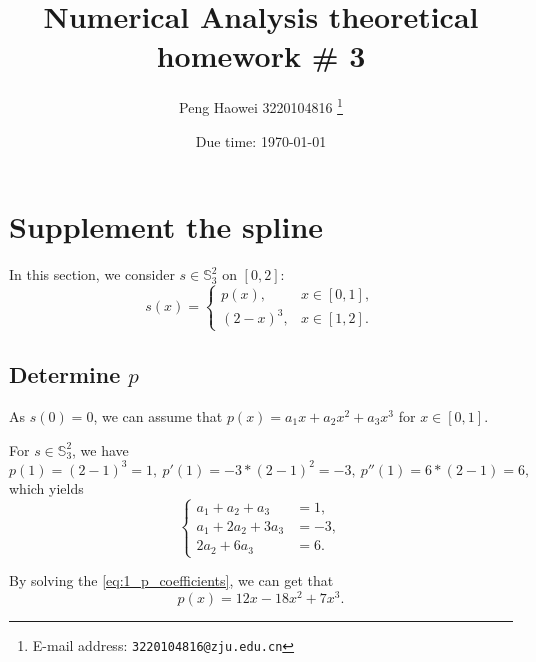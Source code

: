 \documentclass[a4paper]{article}
\begin{document}
\title{\textbf{Numerical Analysis theoretical homework \# 3}}

\author{Peng Haowei 3220104816
  \thanks{E-mail address: \texttt{3220104816@zju.edu.cn}}}

\date{Due time: \today}

\maketitle

\section{Supplement the spline}

In this section, we consider $s \in \mathbb{S}_3^2$ on $[0, 2]$:
\begin{equation}
  s(x) = \begin{cases}
    p(x) ,& x \in [0, 1], \\
    (2 - x)^3 ,& x \in [1, 2].
  \end{cases}
  \label{eq:1_problem}
\end{equation}

\subsection{Determine $p$}

As $s(0) = 0$, we can assume that $p(x) = a_1 x + a_2 x^2 + a_3 x^3$ for $x \in [0, 1]$.

For $s \in \mathbb{S}_3^2$, we have
\begin{equation}
    p(1) = (2 - 1)^3 = 1,\
    p'(1) = -3*(2 - 1)^2 = -3,\
    p''(1) = 6*(2 - 1) = 6,
  \label{eq:1_p_derivatives}
\end{equation}
which yields
\begin{equation}
  \begin{cases}
    a_1 + a_2 + a_3 &= 1,\\
    a_1 + 2a_2 + 3a_3 &= -3, \\
    2a_2 + 6a_3 &= 6.
  \end{cases}
  \label{eq:1_p_coefficients}
\end{equation}

By solving the \cref{eq:1_p_coefficients}, we can get that 
\begin{equation}
  p(x) = 12x - 18x^2 + 7x^3.
  \label{eq:1_p_solution}
\end{equation}
\end{document}
